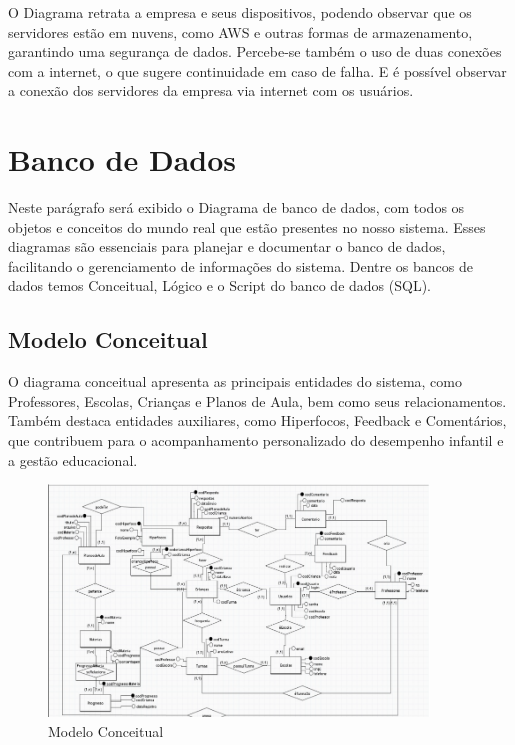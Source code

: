 \documentclass[
  a4paper,
  12pt,
  english,
  brazilian,
]{article}
\begin{document}
O Diagrama retrata a empresa e seus dispositivos, podendo observar que os servidores estão em nuvens, como AWS e outras formas de armazenamento, garantindo uma segurança de dados. Percebe-se também o uso de duas conexões com a internet, o que sugere continuidade em caso de falha. E é possível observar a conexão dos servidores da empresa via internet com os usuários.

\section*{Banco de Dados}

Neste parágrafo será exibido o Diagrama de banco de dados, com todos os objetos e conceitos do mundo real que estão presentes no nosso sistema. Esses diagramas são essenciais para planejar e documentar o banco de dados, facilitando o gerenciamento de informações do sistema. Dentre os bancos de dados temos Conceitual, Lógico e o Script do banco de dados (SQL).

\subsection*{Modelo Conceitual}

O diagrama conceitual apresenta as principais entidades do sistema, como Professores, Escolas, Crianças e Planos de Aula, bem como seus relacionamentos. Também destaca entidades auxiliares, como Hiperfocos, Feedback e Comentários, que contribuem para o acompanhamento personalizado do desempenho infantil e a gestão educacional.

\begin{figure}[H]
\centering
\caption{Modelo Conceitual}%
\label{fig:modelo-conceitual}
\includegraphics[width=0.9\textwidth]{Logos/modelo_conceitual.png}
\end{figure}
\end{document}
